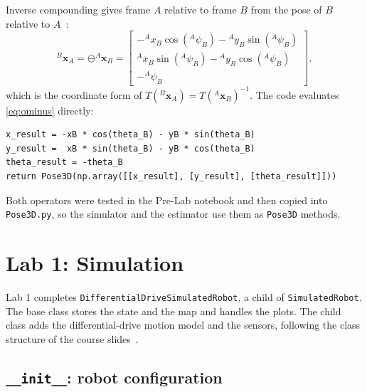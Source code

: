 \documentclass[letterpaper,12pt]{article}
\newcommand{\ominuspose}{\mathbin{\ominus}}
\begin{document}
Inverse compounding gives frame $A$ relative to frame $B$ from the pose of
$B$ relative to $A$~\cite[p.~27]{slidesIntro}:
\begin{equation}
{}^{B}\boldsymbol{x}_{A}=\ominuspose{}^{A}\boldsymbol{x}_{B}
=
\begin{bmatrix}
-{}^{A}x_B\cos({}^{A}\psi_B)-{}^{A}y_B\sin({}^{A}\psi_B)\\
 {}^{A}x_B\sin({}^{A}\psi_B)-{}^{A}y_B\cos({}^{A}\psi_B)\\
-{}^{A}\psi_B
\end{bmatrix},
\label{eq:ominus}
\end{equation}
which is the coordinate form of
$T({}^{B}\boldsymbol{x}_{A})=T({}^{A}\boldsymbol{x}_{B})^{-1}$. The code
evaluates \cref{eq:ominus} directly:
\begin{lstlisting}[caption={Core of the inverse compounding implementation.}]
x_result = -xB * cos(theta_B) - yB * sin(theta_B)
y_result =  xB * sin(theta_B) - yB * cos(theta_B)
theta_result = -theta_B
return Pose3D(np.array([[x_result], [y_result], [theta_result]]))
\end{lstlisting}

Both operators were tested in the Pre-Lab notebook and then copied into
\texttt{Pose3D.py}, so the simulator and the estimator use them as
\texttt{Pose3D} methods.

\section{Lab 1: Simulation}
\label{sec:simulation}

Lab 1 completes \texttt{DifferentialDriveSimulatedRobot}, a child of
\texttt{SimulatedRobot}. The base class stores the state and the map and
handles the plots. The child class adds the differential-drive motion model
and the sensors, following the class structure of the course
slides~\cite[pp.~35--36]{slidesIntro}.

\subsection{\texttt{\_\_init\_\_}: robot configuration}
\end{document}
